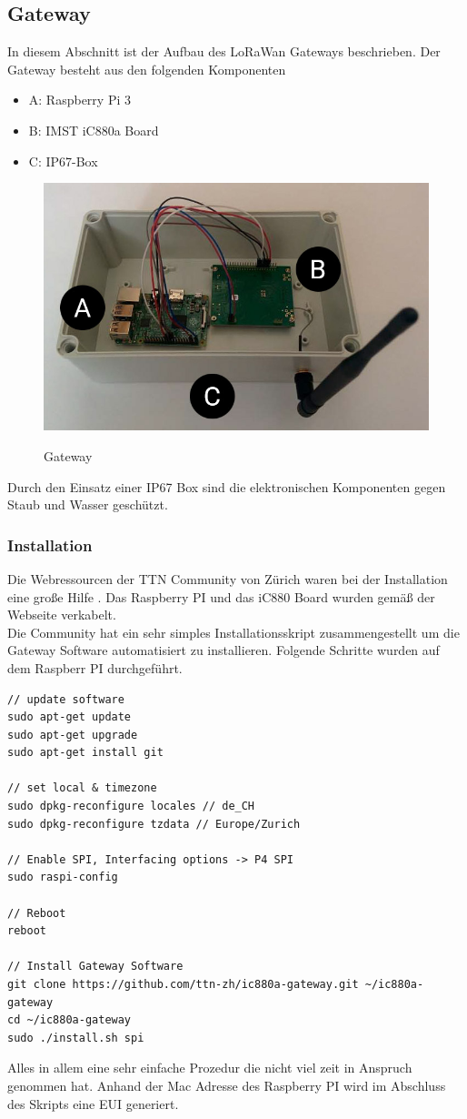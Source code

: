 \documentclass[11pt,english,german]{report}
\theoremstyle{definition}
\begin{document}
\subsection{Gateway}
In diesem Abschnitt ist der Aufbau des LoRaWan Gateways beschrieben. Der Gateway besteht aus den folgenden Komponenten
\begin{itemize}
	\item A: Raspberry Pi 3
	\item B: IMST iC880a Board \cite{ic880}
	\item C: IP67-Box
\end{itemize}
\begin{figure}[h]
	\centering
	\includegraphics[width=\textwidth]{img/gateway/gateway.jpg}\\[0.3cm]
	\caption[Gateway]
	{Gateway}
\end{figure}
Durch den Einsatz einer IP67 Box sind die elektronischen Komponenten gegen Staub und Wasser geschützt.

\newpage
\subsubsection{Installation}
Die Webressourcen der TTN Community von Zürich waren bei der Installation eine große Hilfe \cite{ttnzürich}. Das Raspberry PI und das iC880 Board wurden gemäß der Webseite verkabelt.\\[0.3cm]
Die Community hat ein sehr simples Installationsskript zusammengestellt um die Gateway Software automatisiert zu installieren. Folgende Schritte wurden auf dem Raspberr PI durchgeführt.
\lstset{language=C++}
\begin{lstlisting}
// update software
sudo apt-get update
sudo apt-get upgrade
sudo apt-get install git

// set local & timezone
sudo dpkg-reconfigure locales // de_CH
sudo dpkg-reconfigure tzdata // Europe/Zurich

// Enable SPI, Interfacing options -> P4 SPI
sudo raspi-config

// Reboot
reboot

// Install Gateway Software
git clone https://github.com/ttn-zh/ic880a-gateway.git ~/ic880a-gateway
cd ~/ic880a-gateway
sudo ./install.sh spi
\end{lstlisting}
Alles in allem eine sehr einfache Prozedur die nicht viel zeit in Anspruch genommen hat. Anhand der Mac Adresse des Raspberry PI wird im Abschluss des Skripts eine EUI generiert.
\newpage
\end{document}
